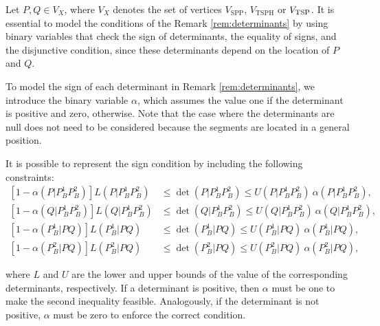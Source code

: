 \documentclass[a4paper,  review, authoryear, 1p.]{elsarticle}
\newcommand{\VSPP}{{V_{\text{SPP}}}}
\newcommand{\VTSPH}{{V_{\text{TSPH}}}}
\newcommand{\determinant}[3]{\det({#1|#2#3})}
\begin{document}
	
	
	
	Let $P,Q\in V_X$, where $V_X$ denotes the set of vertices $\VSPP$, $\VTSPH$ or $V_{\rm{TSP}}$. It is essential to model the conditions of the Remark \ref{rem:determinants} by using binary variables that check the sign of determinants, the equality of signs, and the disjunctive condition, since these determinants depend on the location of $P$ and $Q$.
	
	\newcommand{\LS}[3]{L(#1|#2#3)}
	\newcommand{\US}[3]{U(#1|#2#3)}
	\newcommand{\alphamas}[3]{\alpha(#1|#2#3)}
	\newcommand{\alphamenos}[3]{\alpha^{-}(#1|#2#3)}
	\newcommand{\alphapunto}[3]{\alpha^{\cdotp}(#1|#2#3)}
	
	To model the sign of each determinant in Remark \ref{rem:determinants}, we introduce the binary variable $\alpha$, which assumes the value one if the determinant is positive and zero, otherwise. Note that the case where the determinants are null does not need to be considered because the segments are located in a general position.
	
	It is possible to represent the sign condition by including the following constraints:
	\begin{align*}\tag{$\alpha$-C}\label{eq:alphaC}
		\left[1-\alphamas{P}{P_B^1}{P_B^2}\right]\LS{P}{P_B^1}{P_B^2}&\leq\determinant{P}{P_B^1}{P_B^2}\leq \US{P}{P_B^1}{P_B^2}\:\alphamas{P}{P_B^1}{P_B^2},\\
		\left[1-\alphamas{Q}{P_B^1}{P_B^2}\right]\LS{Q}{P_B^1}{P_B^2}&\leq\determinant{Q}{P_B^1}{P_B^2}\leq \US{Q}{P_B^1}{P_B^2}\:\alphamas{Q}{P_B^1}{P_B^2},\\
		\left[1-\alphamas{P_B^1}{P}{Q}\right]\LS{P_B^1}{P}{Q}&\leq\determinant{P_B^1}{P}{Q}\leq \US{P_B^1}{P}{Q}\:\alphamas{P_B^1}{P}{Q},\\		\left[1-\alphamas{P_B^2}{P}{Q}\right]\LS{P_B^2}{P}{Q}&\leq\determinant{P_B^2}{P}{Q}\leq \US{P_B^2}{P}{Q}\:\alphamas{P_B^2}{P}{Q},
	\end{align*}
	
	\noindent where $L$ and $U$ are the lower and upper bounds of the value of the corresponding determinants, respectively. If a determinant is positive, then $\alpha$ must be one to make the second inequality feasible. Analogously, if the determinant is not positive, $\alpha$ must be zero to enforce the correct condition.
	
	\newcommand{\betamas}[4]{\beta(#1#2|#3#4)}
	
\end{document}
